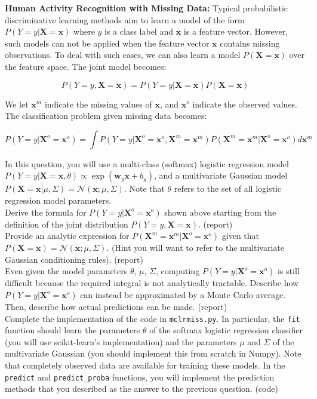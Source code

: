 \documentclass[11pt]{article}
\newcommand{\mbf}[1]{{\mathbf{#1}}}
\begin{document}
\begin{problem}{50} \textbf{Human Activity Recognition with Missing Data:} Typical probabilistic discriminative learning methods
aim  to learn a model of the form $P(Y=y|\mbf{X}=\mbf{x})$ where $y$ is a class label and $\mbf{x}$ is a feature vector. However,
such models can not be applied when the feature vector $\mbf{x}$ contains missing observations. To deal with such cases,
we can also learn a model $P(\mbf{X}=\mbf{x})$ over the feature space. The joint model becomes:

$$P(Y=y,\mbf{X}=\mbf{x})=P(Y=y|\mbf{X}=\mbf{x})P(\mbf{X}=\mbf{x})$$

We let $\mbf{x}^m$ indicate the missing values of $\mbf{x}$, and $\mbf{x}^o$ indicate the observed values. The classification
problem given missing data becomes:

$$P(Y=y|\mbf{X}^o=\mbf{x}^o)=\int P(Y=y|\mbf{X}^o=\mbf{x}^o,\mbf{X}^m=\mbf{x}^m)P(\mbf{X}^m=\mbf{x}^m|\mbf{X}^o=\mbf{x}^o)d\mbf{x}^m$$

In this question, you will use a multi-class (softmax) logistic regression model $P(Y=y|\mbf{X}=\mbf{x},\theta)\propto \exp(\mbf{w}_y\mbf{x}+b_y)$,
and a multivariate Gaussian model $P(\mbf{X}=\mbf{x}|\mu,\Sigma)=\mathcal{N}(\mbf{x};\mu,\Sigma)$. Note that $\theta$ refers to the set of all
logistic regression model parameters.\\

 Derive the formula for $P(Y=y|\mbf{X}^o=\mbf{x}^o)$ shown above starting from the definition of the joint
distribution $P(Y=y,\mbf{X}=\mbf{x})$. (report)\\

 Provide an analytic expression for $P(\mbf{X}^m=\mbf{x}^m|\mbf{X}^o=\mbf{x}^o)$ given that 
$P(\mbf{X}=\mbf{x})=\mathcal{N}(\mbf{x};\mu,\Sigma)$. (Hint you will want to refer to the multivariate Gaussian
conditioning rules). (report)\\

 Even given the model parameters $\theta$, $\mu$, $\Sigma$, computing $P(Y=y|\mbf{X}^o=\mbf{x}^o)$
is still difficult because the required integral is not analytically tractable.
Describe how $P(Y=y|\mbf{X}^o=\mbf{x}^o)$ can instead be approximated by a Monte Carlo average. Then, describe 
how actual predictions can be made. (report)\\

 Complete the implementation of the code in \verb|mclrmiss.py|. In particular,
the \verb|fit| function should learn the parameters $\theta$ of the softmax logistic regression classifier
(you will use scikit-learn's implementation) and the parameters $\mu$ and $\Sigma$ of the multivariate 
Gaussian (you should implement this from scratch in Numpy). Note that completely observed data are 
available for training these models. In the \verb|predict| and \verb|predict_proba| functions, you will 
implement the prediction methods that you described as the answer to the previous question. (code)\\


\end{problem}
\end{document}

